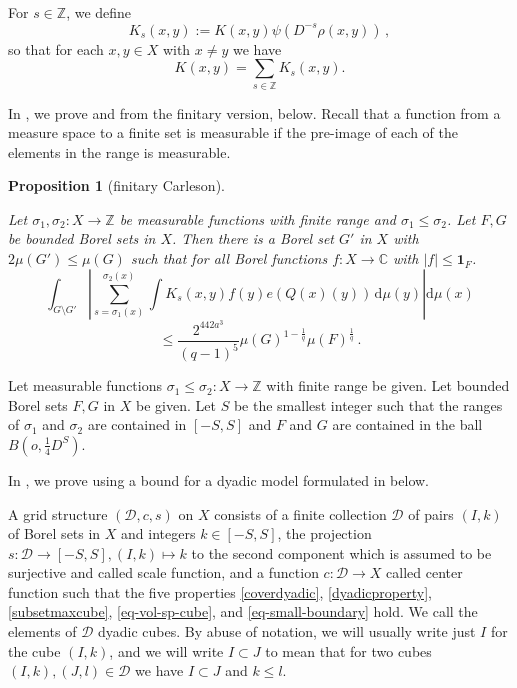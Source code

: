 \documentclass[10pt,a4paper]{article}
\theoremstyle{plain}
\newtheorem{proposition}[theorem]{Proposition}
\theoremstyle{definition}
\numberwithin{equation}{subsection}
\newcommand{\tQ}{{Q}}
\newcommand{\lean}[1]{}
\newcommand{\uses}[1]{}
\newcommand{\leanok}{}
\def\C{\mathbb{C}}
\begin{document}
For $s\in\mathbb{Z}$, we define
\begin{equation}\label{defks}
    K_s(x,y):=K(x,y)\psi(D^{-s}\rho(x,y))\,,
\end{equation}
so that for each $x, y \in X$ with $x\neq y$ we have
$$K(x,y)=\sum_{s\in\mathbb{Z}}K_s(x,y).$$

In , we prove  and 
from the finitary version,  below. Recall
that a function from a measure space to a finite set is measurable if the pre-image of each of the elements in the range is measurable.


\begin{proposition}[finitary Carleson]
\label{finitary-Carleson}
\leanok
\lean{finitary_carleson}
\uses{discrete-Carleson, grid-existence, tile-structure, tile-sum-operator}
Let ${\sigma_1},\sigma_2\colon X\to \mathbb{Z}$ be measurable functions with finite range and ${\sigma_1}\leq \sigma_2$.  Let $F,G$ be bounded Borel sets in $X$. Then there is a Borel set $G'$ in $X$ with $2\mu(G')\leq \mu(G)$ such that
for all Borel functions $f:X\to \C$ with $|f|\le \mathbf{1}_F$.
\begin{equation*}
    \int_{G \setminus G'} \left|\sum_{s={\sigma_1}(x)}^{{\sigma_2}(x)} \int K_s(x,y) f(y) e(\tQ(x)(y)) \, \mathrm{d}\mu(y) \right| \mathrm{d}\mu(x)
\end{equation*}
\begin{equation}
    \label{eq-linearized}
    \le \frac{2^{442a^3}}{(q-1)^5} \mu(G)^{1-\frac{1}{q}} \mu(F)^{\frac 1 q}\,.
\end{equation}
\end{proposition}
Let measurable functions ${\sigma_1}\leq \sigma_2\colon X\to \mathbb{Z}$ with finite range be given.
Let bounded Borel sets $F,G$ in $X$ be given.
Let $S$ be the smallest integer such that the ranges of
$\sigma_1$ and $\sigma_2$ are contained in $[-S,S]$ and $F$ and $G$ are contained
in the ball $B(o, \frac{1}{4}D^S)$.

In , we prove  using a
bound for a dyadic model formulated in  below.

A grid structure $(\mathcal{D}, c, s)$ on $X$ consists of a finite collection $\mathcal{D}$ of pairs $(I, k)$ of Borel
sets in $X$ and integers $k \in [-S, S]$, the projection $s\colon \mathcal{D}\to [-S, S], (I, k) \mapsto k$ to the second component which is assumed to be surjective and
called scale function, and a function $c:\mathcal{D}\to X$
called center function such that the five properties
\eqref{coverdyadic}, \eqref{dyadicproperty}, \eqref{subsetmaxcube},
\eqref{eq-vol-sp-cube}, and \eqref{eq-small-boundary} hold. We call the elements of $\mathcal{D}$ dyadic cubes. By abuse of notation, we will usually write just $I$ for the cube $(I,k)$, and we will write $I \subset J$ to mean that for two cubes $(I,k), (J, l) \in \mathcal{D}$ we have $I \subset J$ and $k \le l$.
\end{document}
